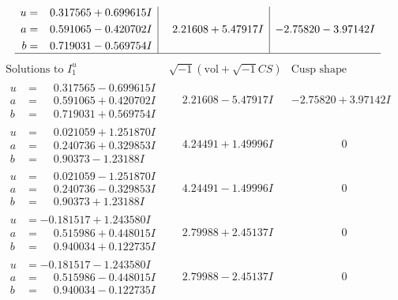 \documentclass[1p]{elsarticle_modified}
\theoremstyle{definition}
\newcommand{\I}{\sqrt{-1}}
\begin{document}
$$\begin{array}{c|c|c}
\begin{aligned}
u &= \phantom{-}0.317565 + 0.699615 I \\
a &= \phantom{-}0.591065 - 0.420702 I \\
b &= \phantom{-}0.719031 - 0.569754 I\end{aligned}
 & \phantom{-}2.21608 + 5.47917 I & -2.75820 - 3.97142 I\\
 \hline 
 \end{array}$$\newpage$$\begin{array}{c|c|c}  
\text{Solutions to }I^u_{1}& \I (\text{vol} + \sqrt{-1}CS) & \text{Cusp shape}\\
 \hline 
\begin{aligned}
u &= \phantom{-}0.317565 - 0.699615 I \\
a &= \phantom{-}0.591065 + 0.420702 I \\
b &= \phantom{-}0.719031 + 0.569754 I\end{aligned}
 & \phantom{-}2.21608 - 5.47917 I & -2.75820 + 3.97142 I \\ \hline\begin{aligned}
u &= \phantom{-}0.021059 + 1.251870 I \\
a &= \phantom{-}0.240736 + 0.329853 I \\
b &= \phantom{-}0.90373 - 1.23188 I\end{aligned}
 & \phantom{-}4.24491 + 1.49996 I & \phantom{-0.000000 } 0 \\ \hline\begin{aligned}
u &= \phantom{-}0.021059 - 1.251870 I \\
a &= \phantom{-}0.240736 - 0.329853 I \\
b &= \phantom{-}0.90373 + 1.23188 I\end{aligned}
 & \phantom{-}4.24491 - 1.49996 I & \phantom{-0.000000 } 0 \\ \hline\begin{aligned}
u &= -0.181517 + 1.243580 I \\
a &= \phantom{-}0.515986 + 0.448015 I \\
b &= \phantom{-}0.940034 + 0.122735 I\end{aligned}
 & \phantom{-}2.79988 + 2.45137 I & \phantom{-0.000000 } 0 \\ \hline\begin{aligned}
u &= -0.181517 - 1.243580 I \\
a &= \phantom{-}0.515986 - 0.448015 I \\
b &= \phantom{-}0.940034 - 0.122735 I\end{aligned}
 & \phantom{-}2.79988 - 2.45137 I & \phantom{-0.000000 } 0 \\ \hline\begin{aligned}

\end{aligned}
\end{array}$$
\end{document}
